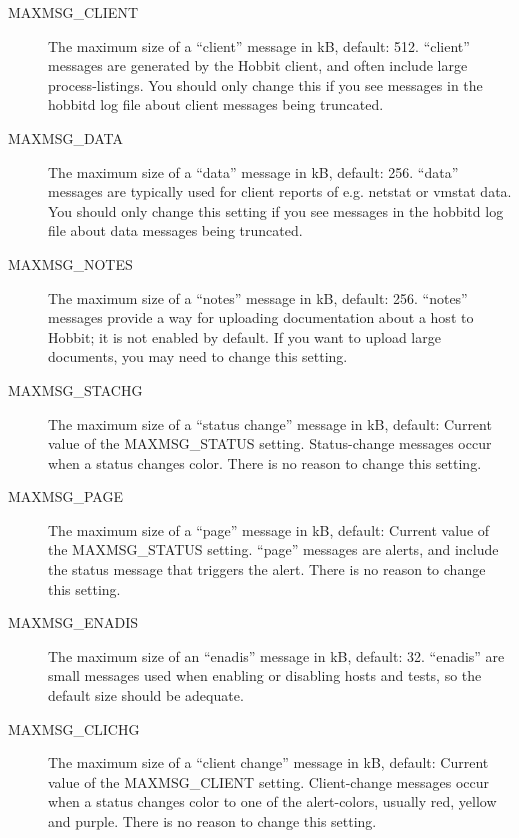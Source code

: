 \begin{description}
 

\item[MAXMSG\_CLIENT] The maximum size of a ``client'' message in kB, default: 512. ``client'' messages are generated by the Hobbit client, and often include large process-listings. You should only change this if you see messages in the hobbitd log file about client messages being truncated. 

 

\item[MAXMSG\_DATA] The maximum size of a ``data'' message in kB, default: 256. ``data'' messages are typically used for client reports of e.g. netstat or vmstat data. You should only change this setting if you see messages in the hobbitd log file about data messages being truncated. 

 

\item[MAXMSG\_NOTES] The maximum size of a ``notes'' message in kB, default: 256. ``notes'' messages provide a way for uploading documentation about a host to Hobbit; it is not enabled by default. If you want to upload large documents, you may need to change this setting. 

 

\item[MAXMSG\_STACHG] The maximum size of a ``status change'' message in kB, default: Current value of the MAXMSG\_STATUS setting. Status-change messages occur when a status changes color. There is no reason to change this setting. 

 

\item[MAXMSG\_PAGE] The maximum size of a ``page'' message in kB, default: Current value of the MAXMSG\_STATUS setting. ``page'' messages are alerts, and include the status message that triggers the alert. There is no reason to change this setting. 

 

\item[MAXMSG\_ENADIS] The maximum size of an ``enadis'' message in kB, default: 32. ``enadis'' are small messages used when enabling or disabling hosts and tests, so the default size should be adequate. 

 

\item[MAXMSG\_CLICHG] The maximum size of a ``client change'' message in kB, default: Current value of the MAXMSG\_CLIENT setting. Client-change messages occur when a status changes color to one of the alert-colors, usually red, yellow and purple. There is no reason to change this setting. 

 


 


\end{description}

